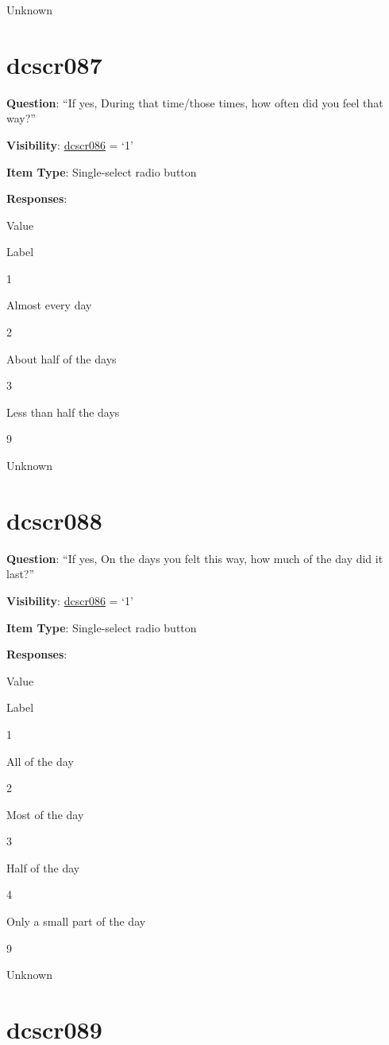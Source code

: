 \documentclass[]{book}
\begin{document}
Unknown

\hypertarget{dcscr087}{%
\section{dcscr087}\label{dcscr087}}

\textbf{Question}: ``If yes, During that time/those times, how often did you feel that way?''

\textbf{Visibility}: \protect\hyperlink{dcscr086}{dcscr086} = `1'

\textbf{Item Type}: Single-select radio button

\textbf{Responses}:

Value

Label

1

Almost every day

2

About half of the days

3

Less than half the days

9

Unknown

\hypertarget{dcscr088}{%
\section{dcscr088}\label{dcscr088}}

\textbf{Question}: ``If yes, On the days you felt this way, how much of the day did it last?''

\textbf{Visibility}: \protect\hyperlink{dcscr086}{dcscr086} = `1'

\textbf{Item Type}: Single-select radio button

\textbf{Responses}:

Value

Label

1

All of the day

2

Most of the day

3

Half of the day

4

Only a small part of the day

9

Unknown

\hypertarget{dcscr089}{%
\section{dcscr089}\label{dcscr089}}
\end{document}
